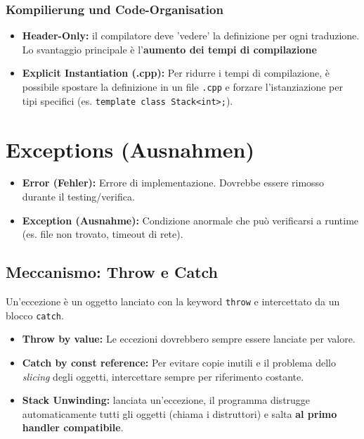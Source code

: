 \subsubsection{Kompilierung und Code-Organisation}
\begin{itemize}
    \item \textbf{Header-Only:}  il compilatore deve 'vedere' la definizione per ogni 
    traduzione. Lo svantaggio principale è l'\textbf{aumento dei tempi di compilazione} 
    \item \textbf{Explicit Instantiation (.cpp):} Per ridurre i tempi di compilazione, 
    è possibile spostare la definizione in un file \verb|.cpp| e forzare l'istanziazione 
    per tipi specifici (es. \lstinline|template class Stack<int>;|). 
\end{itemize}

\section{Exceptions (Ausnahmen)}
\begin{itemize}
    \item \textbf{Error (Fehler):} Errore di implementazione. Dovrebbe essere rimosso durante il testing/verifica.
    \item \textbf{Exception (Ausnahme):} Condizione anormale che può verificarsi a runtime (es. file non trovato, timeout di rete).
\end{itemize}


\subsection{Meccanismo: Throw e Catch}
Un'eccezione è un oggetto lanciato con la keyword \texttt{throw} e intercettato da un blocco \texttt{catch}.

\begin{itemize}
    \item \textbf{Throw by value:} Le eccezioni dovrebbero sempre essere lanciate per valore.
    \item \textbf{Catch by const reference:} Per evitare copie inutili e il problema dello \textit{slicing} degli oggetti, intercettare sempre per riferimento costante.
    \item \textbf{Stack Unwinding:} lanciata un'eccezione, il programma distrugge 
    automaticamente tutti gli oggetti (chiama i distruttori) e salta 
    \textbf{al primo handler compatibile}.
\end{itemize}

